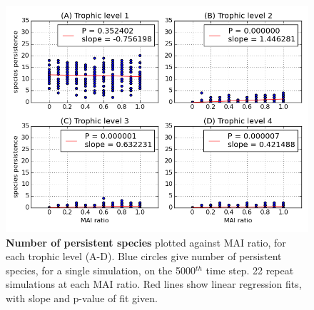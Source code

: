 

\begin{figure}
	\centering
	\includegraphics[width=0.8\linewidth]{"figures/persistence/species_richness_per_trophic_level"}
	\caption{\textbf{Number of persistent species} plotted against MAI ratio, for each trophic level (A-D). Blue circles give number of persistent species, for a single simulation, on the 5000$^{th}$ time step. 22 repeat simulations at each MAI ratio. Red lines show linear regression fits, with slope and p-value of fit given.}
	\label{fig:mvp_species_per_tl}
\end{figure}


